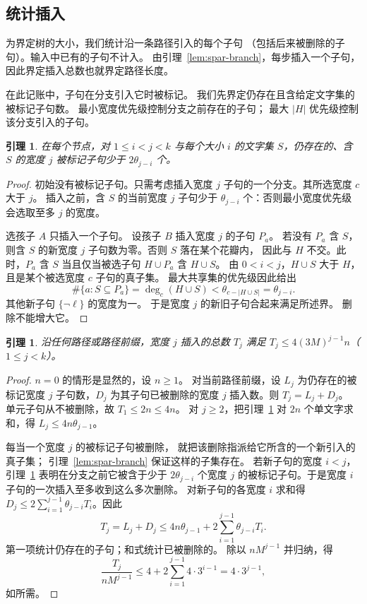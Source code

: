 \documentclass[11pt,reqno]{amsart}
\numberwithin{equation}{section}
\newtheorem{lemma}[theorem]{引理}
\theoremstyle{definition}\newtheorem{definition}[theorem]{定义}
\theoremstyle{remark}\newtheorem{remark}[theorem]{注}
\renewcommand{\le}{\leqslant}
\renewcommand{\ge}{\geqslant}
\begin{document}
\subsection{统计插入}
为界定树的大小，我们统计沿一条路径引入的每个子句
（包括后来被删除的子句）。输入中已有的子句不计入。
由引理~\ref{lem:spar-branch}，每步插入一个子句，
因此界定插入总数也就界定路径长度。

在此记账中，子句在分支引入它时被标记。
我们先界定仍存在且含给定文字集的被标记子句数。
最小宽度优先级控制分支之前存在的子句；
最大 $|H|$ 优先级控制该分支引入的子句。

\begin{lemma}\label{lem:spar-marked-degree}
在每个节点，对 $1\le i<j<k$ 与每个大小 $i$
的文字集 $S$，仍存在的、含 $S$ 的宽度 $j$
被标记子句少于 $2\theta_{j-i}$ 个。
\end{lemma}
\begin{proof}
初始没有被标记子句。只需考虑插入宽度 $j$
子句的一个分支。其所选宽度 $c$ 大于 $j$。
插入之前，含 $S$ 的当前宽度 $j$ 子句少于
$\theta_{j-i}$ 个：否则最小宽度优先级会选取至多 $j$
的宽度。

选孩子 $A$ 只插入一个子句。
设孩子 $B$ 插入宽度 $j$ 的子句 $P_a$。
若没有 $P_a$ 含 $S$，则含 $S$ 的新宽度 $j$
子句数为零。否则 $S$ 落在某个花瓣内，
因此与 $H$ 不交。此时，$P_a$ 含 $S$
当且仅当被选子句 $H\cup P_a$ 含 $H\cup S$。
由 $0<i<j$，$H\cup S$ 大于 $H$，
且是某个被选宽度 $c$ 子句的真子集。
最大共享集的优先级因此给出
\[
 \#\{a:S\subseteq P_a\}
 =\deg_c(H\cup S)<\theta_{c-|H\cup S|}
 =\theta_{j-i}.
\]
其他新子句 $\{\neg\ell\}$ 的宽度为一。
于是宽度 $j$ 的新旧子句合起来满足所述界。
删除不能增大它。
\end{proof}

\begin{lemma}\label{lem:spar-insertion-bound}
沿任何路径或路径前缀，宽度 $j$ 插入的总数 $T_j$
满足 $T_j\le4(3M)^{j-1}n$（$1\le j<k$）。
\end{lemma}
\begin{proof}
$n=0$ 的情形是显然的，设 $n\ge1$。
对当前路径前缀，设 $L_j$ 为仍存在的被标记宽度 $j$
子句数，$D_j$ 为其子句已被删除的宽度 $j$
插入数。则 $T_j=L_j+D_j$。
单元子句从不被删除，故 $T_1\le2n\le4n$。
对 $j\ge2$，把引理~\ref{lem:spar-marked-degree}
对 $2n$ 个单文字求和，得 $L_j\le4n\theta_{j-1}$。

每当一个宽度 $j$ 的被标记子句被删除，
就把该删除指派给它所含的一个新引入的真子集；
引理~\ref{lem:spar-branch} 保证这样的子集存在。
若新子句的宽度 $i<j$，引理~\ref{lem:spar-marked-degree}
表明在分支之前它被含于少于 $2\theta_{j-i}$
个宽度 $j$ 的被标记子句。于是宽度 $i$
子句的一次插入至多收到这么多次删除。
对新子句的各宽度 $i$ 求和得
$D_j\le2\sum_{i=1}^{j-1}\theta_{j-i}T_i$。因此
\begin{equation}\label{eq:spar-insertions}
 T_j=L_j+D_j\le4n\theta_{j-1}
       +2\sum_{i=1}^{j-1}\theta_{j-i}T_i.
\end{equation}
第一项统计仍存在的子句；和式统计已被删除的。
除以 $nM^{j-1}$ 并归纳，得
\[
 \frac{T_j}{nM^{j-1}}
 \le4+2\sum_{i=1}^{j-1}4\cdot3^{i-1}
 =4\cdot3^{j-1},
\]
如所需。
\end{proof}
\end{document}
